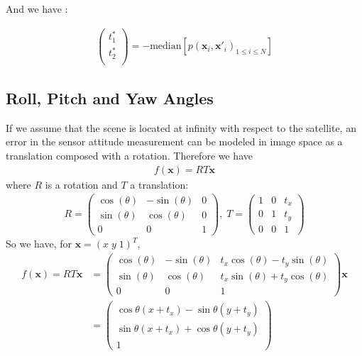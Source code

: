 \documentclass[paper=a4, fontsize=11pt, onecolumn, tikz, dvipsnames, svgnames, x11names]{article}
\begin{document}
And we have :

\begin{align*}
\begin{pmatrix}
t_1^* \\
t_2^* \\
\end{pmatrix} = -\text{median}\left[ p(\textbf{x}_i, \textbf{x}'_i)_{1 \leq i \leq N} \right]
\end{align*}



\subsection{Roll, Pitch and Yaw Angles}
If we assume that the scene is located at infinity with respect to the satellite, an error in the sensor attitude measurement can be modeled in image space as a translation composed with a rotation. Therefore we have
\begin{align*}
f(\textbf{x}) = RT\textbf{x}
\end{align*}
where $R$ is a rotation and $T$ a translation:\\
\begin{align*}
R =
\begin{pmatrix}
\cos(\theta) & -\sin(\theta) & 0 \\
\sin(\theta) & \cos(\theta) & 0 \\
0 & 0 & 1
\end{pmatrix}, \;
T =
\begin{pmatrix}
1 & 0 & t_x \\
0 & 1 & t_y \\
0 & 0 & 1
\end{pmatrix}
\end{align*}
So we have, for $ \textbf{x} = (  x \; y \; 1)^T $,
\begin{align*}
f(\textbf{x}) = RT\textbf{x} &=
\begin{pmatrix}
\cos(\theta) & -\sin(\theta) & t_x\cos(\theta) - t_y\sin(\theta)  \\
\sin(\theta) & \cos(\theta) & t_x\sin(\theta) + t_y\cos(\theta)  \\
0 & 0 & 1
\end{pmatrix} \textbf{x}  \\
&=
    \begin{pmatrix}
    \cos \theta (x + t_x) - \sin \theta (y + t_y)\\
    \sin \theta (x + t_x) + \cos \theta (y + t_y)\\
    1
    \end{pmatrix}
\end{align*}
\end{document}
